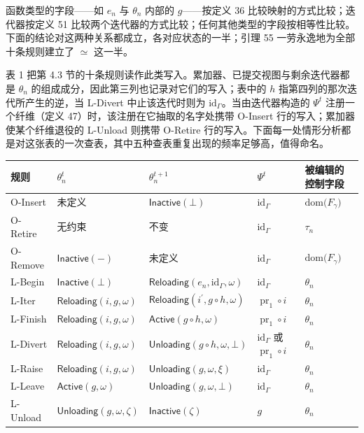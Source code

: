 函数类型的字段——如 $e _ { n }$ 与 $\theta _ { n }$ 内部的 $g$——按定义 36 比较映射的方式比较；迭代器按定义 51 比较两个迭代器的方式比较；任何其他类型的字段按相等性比较。下面的结论对这两种关系都成立，各对应状态的一半；引理 55 一劳永逸地为全部十条规则建立了 $\simeq$ 这一半。

表 1 把第 4.3 节的十条规则读作此类写入。累加器、已提交视图与剩余迭代器都是 $\theta _ { n }$ 的组成成分，因此第三列也记录对它们的写入；表中的 $h$ 指第四列的那次迭代所产生的逆，当 L-Divert 中止该迭代时则为 $\mathrm { i d } _ { \Gamma }$。当由迭代器构造的 $\Psi ^ { t }$ 注册一个纤维（定义 47）时，该注册在它抽取的名字处携带 O-Insert 行的写入；累加器使某个纤维退役的 L-Unload 则携带 O-Retire 行的写入。下面每一处情形分析都是对这张表的一次查表，其中五种查表重复出现的频率足够高，值得命名。

{\def\LTcaptype{none} %
\begin{longtable}[]{@{}|l|l|l|l|l|@{}}
\toprule\noalign{}
\endhead
\bottomrule\noalign{}
\endlastfoot
\hline
规则 & $\theta _ { n } ^ { t }$ & $\theta _ { n } ^ { t + 1 }$ & $\Psi ^ { t }$ & 被编辑的控制字段 \\
\hline
O-Insert & 未定义 & $\mathsf{Inactive}(\bot)$ & $\mathrm { i d } _ { \Gamma }$ & $\mathrm { d o m } \big ( F _ { \gamma } \big )$ \\
\hline
O-Retire & 无约束 & 不变 & $\mathrm { i d } _ { \Gamma }$ & $\tau _ { n }$ \\
\hline
O-Remove & $\mathsf{Inactive}(-)$ & 未定义 & $\mathrm { i d } _ { \Gamma }$ & $\mathrm { d o m } \big ( F _ { \gamma } \big )$ \\
\hline
L-Begin & $\mathsf{Inactive}(\bot)$ & $\mathsf{Reloading}(e _ { n } , \mathrm { i d } _ { \Gamma } , \omega)$ & $\mathrm { i d } _ { \Gamma }$ & $\theta _ { n }$ \\
\hline
L-Iter & $\mathsf{Reloading}(i , g , \omega)$ & $\mathsf{Reloading}(i ^ { \prime } , g \circ h , \omega)$ & $\operatorname { p r } _ { 1 } \circ i$ & $\theta _ { n }$ \\
\hline
L-Finish & $\mathsf{Reloading}(i , g , \omega)$ & $\mathsf{Active}(g \circ h , \omega)$ & $\operatorname { p r } _ { 1 } \circ i$ & $\theta _ { n }$ \\
\hline
L-Divert & $\mathsf{Reloading}(i , g , \omega)$ & $\mathsf{Unloading}(g \circ h , \omega , \bot)$ & $\mathrm { i d } _ { \Gamma }$ 或 $\operatorname { p r } _ { 1 } \circ i$ & $\theta _ { n }$ \\
\hline
L-Raise & $\mathsf{Reloading}(i , g , \omega)$ & $\mathsf{Unloading}(g , \omega , \xi)$ & $\mathrm { i d } _ { \Gamma }$ & $\theta _ { n }$ \\
\hline
L-Leave & $\mathsf{Active}(g , \omega)$ & $\mathsf{Unloading}(g , \omega , \bot)$ & $\mathrm { i d } _ { \Gamma }$ & $\theta _ { n }$ \\
\hline
L-Unload & $\mathsf{Unloading}(g , \omega , \zeta)$ & $\mathsf{Inactive}(\zeta)$ & $g$ & $\theta _ { n }$ \\
\hline
\end{longtable}
}

